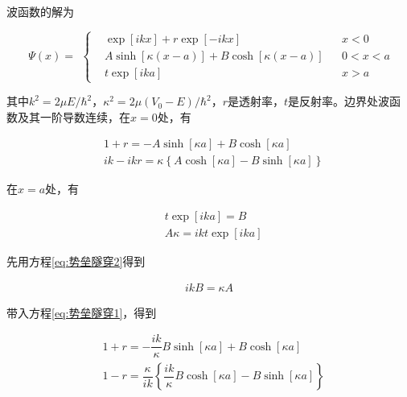 波函数的解为

\begin{equation*}
  \begin{aligned}
    \Psi \left( x \right) = 
  \end{aligned}
  \left\{
  \begin{aligned}
    & \exp \left[ ikx \right] + r \exp \left[ -ikx \right] && x<0 \\
    & A \sinh \left[ \kappa \left( x - a \right) \right] + B \cosh \left[ \kappa \left( x - a \right) \right] && 0<x<a \\
    & t \exp \left[ ika \right] && x>a
  \end{aligned}
  \right.
\end{equation*}

其中$k^2=2\mu E / \hbar^2$，$\kappa^2 = 2 \mu \left( V_0 - E \right) / \hbar^2$，$r$是透射率，$t$是反射率。边界处波函数及其一阶导数连续，在$x=0$处，有

\begin{equation}
  \label{eq:势垒隧穿1}
  \begin{aligned}
    & 1 + r = - A \sinh \left[ \kappa a \right] + B \cosh \left[ \kappa a \right] \\
    & ik - ikr = \kappa \left\{ A \cosh \left[ \kappa a \right] - B \sinh \left[ \kappa a \right] \right\}
  \end{aligned}
\end{equation}

在$x=a$处，有

\begin{equation}
  \label{eq:势垒隧穿2}
  \begin{aligned}
    & t \exp \left[ ika \right] = B \\
    & A \kappa = ikt \exp \left[ ika \right]
  \end{aligned}
\end{equation}

先用方程\ref{eq:势垒隧穿2}得到

\begin{equation*}
  \begin{aligned}
    ikB = \kappa A
  \end{aligned}
\end{equation*}

带入方程\ref{eq:势垒隧穿1}，得到

\begin{equation}
  \label{eq:势垒隧穿3}
  \begin{aligned}
    & 1 + r = - \dfrac{i k}{\kappa} B \sinh \left[ \kappa a \right] + B \cosh \left[ \kappa a \right] \\
    & 1 - r = \dfrac{\kappa}{i k} \left\{ \dfrac{i k}{\kappa} B \cosh \left[ \kappa a \right] - B \sinh \left[ \kappa a \right]  \right\} 
  \end{aligned}
\end{equation}

